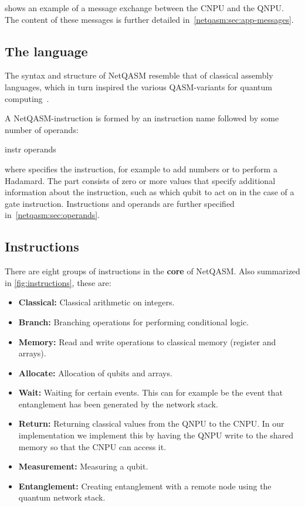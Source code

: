  shows an example of a message exchange between the \ac{CNPU} and the \ac{QNPU}.
The content of these messages is further detailed in~\cref{netqasm:sec:app-messages}.



\subsection{The language}
\label{netqasm:sec:language}
The syntax and structure of \ac{NetQASM} resemble that of classical assembly languages, which in turn inspired the various QASM-variants for quantum computing~\cite{cross2017openqasm, khammassi2018cqasm, fu2019eqasm, liu2017fqasm}.

A \ac{NetQASM}-instruction is formed by an instruction name followed by some number of operands:
\begin{nqcode}
      instr operands
\end{nqcode}
where  specifies the instruction, for example  to add numbers or  to perform a Hadamard.
The  part consists of zero or more values that specify additional information about the instruction, such as which qubit to act on in the case of a gate instruction.
Instructions and operands are further specified in~\cref{netqasm:sec:operands}.

\subsection{Instructions}
\label{netqasm:sec:instructions}
There are eight groups of instructions in the \textbf{core} of \ac{NetQASM}.
Also summarized in \cref{fig:instructions}, these are:
\begin{itemize}
      \item \textbf{Classical:} Classical arithmetic on integers.
      \item \textbf{Branch:} Branching operations for performing conditional logic.
      \item \textbf{Memory:} Read and write operations to classical memory (register and arrays).
      \item \textbf{Allocate:} Allocation of qubits and arrays.
      \item \textbf{Wait:} Waiting for certain events. This can for example be the event that entanglement has been generated by the network stack.
      \item \textbf{Return:} Returning classical values from the \ac{QNPU} to the \ac{CNPU}.
            In our implementation we implement this by having the \ac{QNPU} write to the shared memory so that the \ac{CNPU} can access it.
      \item \textbf{Measurement:} Measuring a qubit.
      \item \textbf{Entanglement:} Creating entanglement with a remote node using the quantum network stack.
\end{itemize}

